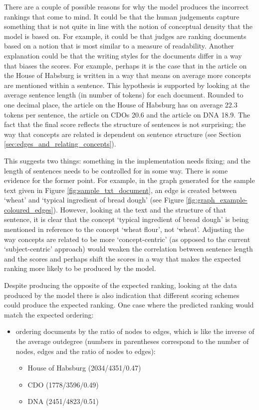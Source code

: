 \documentclass[12pt]{article}
\theoremstyle{grammarstyle}
\begin{document}
There are a couple of possible reasons for why the model produces the incorrect rankings that come to mind.
It could be that the human judgements capture something that is not quite in line with the notion of conceptual density that the model is based on. For example, it could be that judges are ranking documents based on a notion that is most similar to a measure of readability.
Another explanation could be that the writing styles for the documents differ in a way that biases the scores. For example, perhaps it is the case that in the article on the House of Habsburg is written in a way that means on average more concepts are mentioned within a sentence.
This hypothesis is supported by looking at the average sentence length (in number of tokens) for each document.
Rounded to one decimal place, the article on the House of Habsburg has on average 22.3 tokens per sentence, the article on CDOs 20.6 and the article on DNA 18.9.
The fact that the final score reflects the structure of sentences is not surprising; the way that concepts are related is dependent on sentence structure (see Section \ref{sec:edges_and_relating_concepts}).

This suggests two things: something in the implementation needs fixing; and the length of sentences needs to be controlled for in some way.
There is some evidence for the former point. For example, in the graph generated for the sample text given in Figure \ref{fig:sample_txt_document}, an edge is created between `wheat' and `typical ingredient of bread dough' (see Figure \ref{fig:graph_example-coloured_edges}). However, looking at the text and the structure of that sentence, it is clear that the concept `typical ingredient of bread dough' is being mentioned in reference to the concept `wheat flour', not `wheat'.
Adjusting the way concepts are related to be more `concept-centric' (as opposed to the current `subject-centric' approach) would weaken the correlation between sentence length and the scores and perhaps shift the scores in a way that makes the expected ranking more likely to be produced by the model.

Despite producing the opposite of the expected ranking, looking at the data produced by the model there is also indication that different scoring schemes could produce the expected ranking. One case where the predicted ranking would match the expected ordering:

\begin{itemize}
    \item ordering documents by the ratio of nodes to edges, which is like the inverse of the average outdegree (numbers in parentheses correspond to the number of nodes, edges and the ratio of nodes to edges):
    \begin{itemize}
        \item House of Habsburg (2034/4351/0.47)
        \item CDO (1778/3596/0.49)
        \item DNA (2451/4823/0.51)
    \end{itemize}
\end{itemize}
\end{document}
